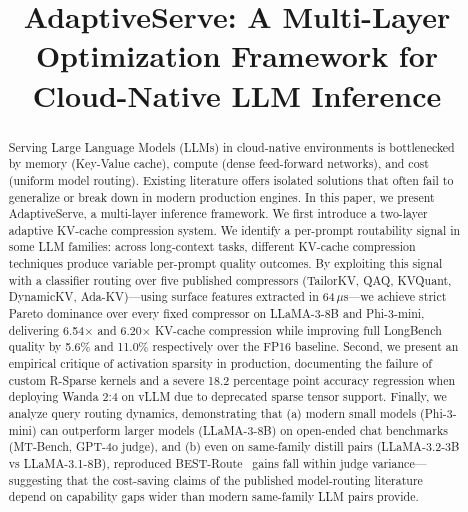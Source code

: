 \documentclass[10pt, conference]{IEEEtran}
\begin{document}
\title{AdaptiveServe: A Multi-Layer Optimization Framework for Cloud-Native LLM Inference}

\author{
}

\maketitle

\begin{abstract}
Serving Large Language Models (LLMs) in cloud-native environments is
bottlenecked by memory (Key-Value cache), compute (dense feed-forward
networks), and cost (uniform model routing). Existing literature offers
isolated solutions that often fail to generalize or break down in modern
production engines. In this paper, we present AdaptiveServe, a multi-layer
inference framework. We first introduce a two-layer adaptive KV-cache
compression system. We identify a per-prompt routability signal in some
LLM families: across long-context tasks, different KV-cache compression
techniques produce variable per-prompt quality outcomes. By exploiting
this signal with a classifier routing over five published compressors
(TailorKV, QAQ, KVQuant, DynamicKV, Ada-KV)---using surface features
extracted in 64\,$\mu$s---we achieve strict Pareto dominance over every
fixed compressor on LLaMA-3-8B and Phi-3-mini, delivering 6.54$\times$
and 6.20$\times$ KV-cache compression while improving full LongBench
quality by 5.6\% and 11.0\% respectively over the FP16 baseline. Second,
we present an empirical critique of activation sparsity in production,
documenting the failure of custom R-Sparse kernels and a severe 18.2
percentage point accuracy regression when deploying Wanda 2:4 on vLLM
due to deprecated sparse tensor support. Finally, we analyze query
routing dynamics, demonstrating that (a) modern small models
(Phi-3-mini) can outperform larger models (LLaMA-3-8B) on open-ended
chat benchmarks (MT-Bench, GPT-4o judge), and (b) even on same-family
distill pairs (LLaMA-3.2-3B vs LLaMA-3.1-8B), reproduced
BEST-Route~\cite{ding2025bestroute} gains fall within judge
variance---suggesting that the cost-saving claims of the published
model-routing literature~\cite{chen2023frugalgpt, ding2024hybridllm,
ong2024routellm} depend on capability gaps wider than modern same-family
LLM pairs provide.
\end{abstract}
\end{document}
